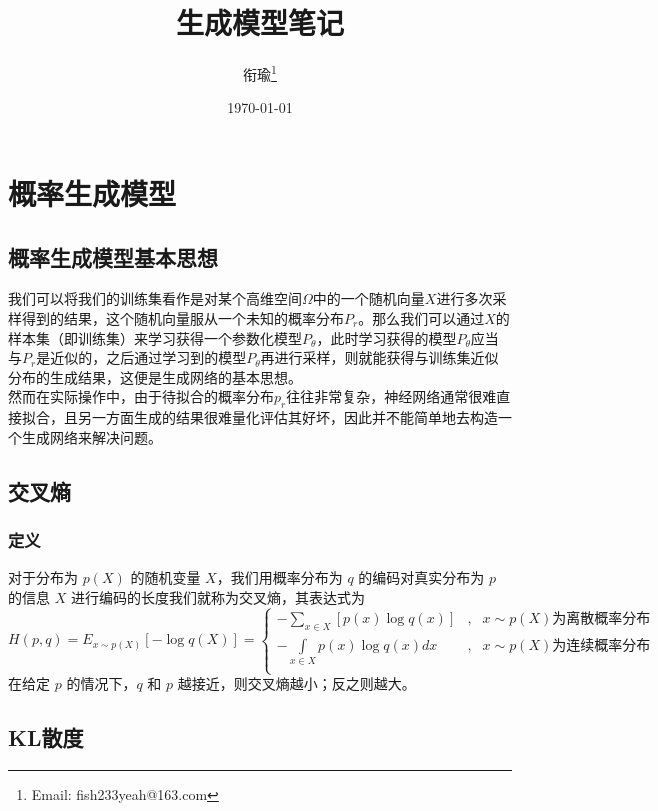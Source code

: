 \documentclass[12pt,a4paper,UTF8]{article}
\begin{document}
\title{生成模型笔记}
\author{衔瑜\thanks{Email: fish233yeah@163.com}}
\date{\today}
\maketitle

\setlength{\parindent}{2em}   %


\section{概率生成模型}
\subsection{概率生成模型基本思想}
\indent 我们可以将我们的训练集看作是对某个高维空间$\Omega$中的一个随机向量$X$进行多次采样得到的结果，这个随机向量服从一个未知的概率分布$P_r$。那么我们可以通过$X$的样本集（即训练集）来学习获得一个参数化模型$P_\theta$，此时学习获得的模型$P_\theta$应当与$P_r$是近似的，之后通过学习到的模型$P_\theta$再进行采样，则就能获得与训练集近似分布的生成结果，这便是生成网络的基本思想。\\
\indent 然而在实际操作中，由于待拟合的概率分布$p_r$往往非常复杂，神经网络通常很难直接拟合，且另一方面生成的结果很难量化评估其好坏，因此并不能简单地去构造一个生成网络来解决问题。

\subsection{交叉熵}
\subsubsection{定义}
\indent 对于分布为 $p\left(X\right)$ 的随机变量 $X$，我们用概率分布为 $q$ 的编码对真实分布为 $p$ 的信息 $X$ 进行编码的长度我们就称为交叉熵，其表达式为
\[H\left(p,q\right)=E_{x\sim p\left(X\right)}\left[-\log q\left(X\right)\right]=\left\{
\begin{matrix}
-\sum\limits_{x\in X}\left[p\left(x\right)\log q\left(x\right)\right]&,&x\sim p\left(X\right)\text{为离散概率分布}\\
-\int\limits_{x\in X}p\left(x\right)\log q\left(x\right)dx&,&x\sim p\left(X\right)\text{为连续概率分布}\\
\end{matrix}
\right.\]
在给定 $p$ 的情况下，$q$ 和 $p$ 越接近，则交叉熵越小；反之则越大。

\subsection{KL散度}
\end{document}
